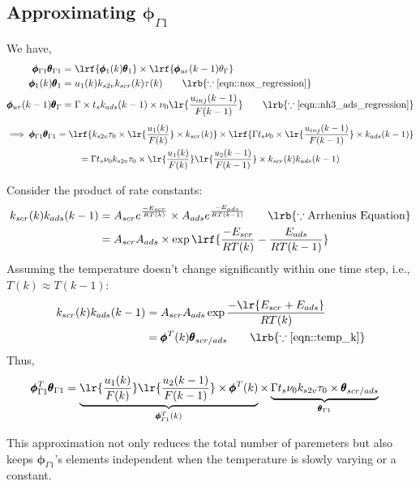 \subsection{Approximating $\pmb \phi_{\Gamma 1}$}

We have,
\begin{align}
        \pmb \phi_{\Gamma 1} \pmb \theta_{\Gamma 1} &= \lrf{\pmb \phi_1 (k) \pmb \theta_1} \times \lrf{\pmb \phi_{ur}(k-1) \theta_{\Gamma}}\\
        \pmb \phi_1 (k)  \pmb \theta_{1}&= u_1(k) k_{s2v} k_{scr}(k) \tau (k) \qquad \lrb{\because \ref{eqn::nox_regression}}\\
        \pmb \phi_{ur}(k-1) \pmb \theta_{\Gamma} &= \Gamma \times t_s k_{ads}(k-1) \times \nu_0 \lr{\frac{u_{inj}(k-1)}{F(k-1)}}
        \qquad \lrb{\because \ref{eqn::nh3_ads_regression}}\\
\end{align}
\begin{multline}
        \implies  \pmb \phi_{\Gamma 1} \pmb \theta_{\Gamma 1} =
                \lrf{k_{s2v} \tau_0 \times \lr{\frac{u_1(k)}{F(k)}} \times k_{scr}(k)} \times
                \lrf{\Gamma t_s \nu_0 \times \lr{\frac{u_{inj}(k-1)}{F(k-1)}} \times k_{ads}(k-1)} \\
        = \Gamma t_s \nu_0 k_{s2v} \tau_0 \times \lr{\frac{u_1(k)}{F(k)}} \lr{\frac{u_2(k-1)}{F(k-1)}} \times  k_{scr}(k) k_{ads}(k-1)
\end{multline}

Consider the product of rate constants:
\begin{align*}
        k_{scr}(k) k_{ads}(k-1) &= A_{scr} e^{\frac{-E_{scr}}{R T(k)}} \times A_{ads} e^{\frac{-E_{ads}}{R T(k-1)}} \qquad \lrb{\because \text{Arrhenius Equation}}\\
        &= A_{scr}A_{ads} \times \exp \lrf{\frac{-E_{scr}}{R T(k)} - \frac{E_{ads}}{R T(k-1)}}
\end{align*}
Assuming the temperature doesn't change significantly within one time step, i.e., $T(k) \approx T(k-1)$:
\begin{align}
        k_{scr}(k) k_{ads}(k-1) &= A_{scr}A_{ads} \exp{\frac{-\lr{E_{scr}+E_{ads}}}{R T(k)}}\\
                                &= \pmb \phi^T(k) \pmb \theta_{scr/ads} \qquad \lrb{\because \ref{eqn::temp_k}}
\end{align}
Thus,
\begin{align}
        \pmb \phi_{\Gamma 1}^T \pmb \theta_{\Gamma 1} &=
        \underbrace{ \lr{\frac{u_1(k)}{F(k)}} \lr{\frac{u_2(k-1)}{F(k-1)}} \times \pmb \phi^T(k)}
        _{\pmb \phi_{\Gamma 1}^T(k)}  \times
        \underbrace{ \Gamma t_s \nu_0 k_{s2v} \tau_0 \times \pmb \theta_{scr/ads}}
        _{\pmb \theta_{\Gamma 1}}
\end{align}

This approximation not only reduces  the total number of paremeters but also keeps $\pmb \phi_{\Gamma 1}$'s elements independent when the temperature is slowly varying or a constant.

